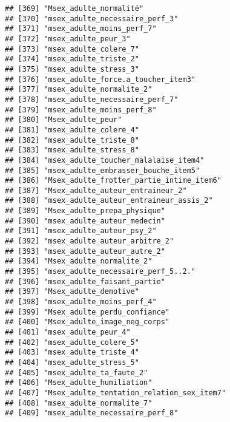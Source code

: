 \documentclass[
]{article}
\begin{document}
\begin{verbatim}
## [369] "Msex_adulte_normalité"                               
## [370] "msex_adulte_necessaire_perf_3"                       
## [371] "msex_adulte_moins_perf_7"                            
## [372] "msex_adulte_peur_3"                                  
## [373] "msex_adulte_colere_7"                                
## [374] "msex_adulte_triste_2"                                
## [375] "msex_adulte_stress_3"                                
## [376] "msex_adulte_force.a_toucher_item3"                   
## [377] "msex_adulte_normalite_2"                             
## [378] "msex_adulte_necessaire_perf_7"                       
## [379] "msex_adulte_moins_perf_8"                            
## [380] "Msex_adulte_peur"                                    
## [381] "msex_adulte_colere_4"                                
## [382] "msex_adulte_triste_8"                                
## [383] "msex_adulte_stress_8"                                
## [384] "msex_adulte_toucher_malalaise_item4"                 
## [385] "msex_adulte_embrasser_bouche_item5"                  
## [386] "Msex_adulte_frotter_partie_intime_item6"             
## [387] "Msex_adulte_auteur_entraineur_2"                     
## [388] "msex_adulte_auteur_entraineur_assis_2"               
## [389] "Msex_adulte_prepa_physique"                          
## [390] "msex_adulte_auteur_medecin"                          
## [391] "msex_adulte_auteur_psy_2"                            
## [392] "msex_adulte_auteur_arbitre_2"                        
## [393] "msex_adulte_auteur_autre_2"                          
## [394] "Msex_adulte_normalite_2"                             
## [395] "msex_adulte_necessaire_perf_5..2."                   
## [396] "msex_adulte_faisant_partie"                          
## [397] "Msex_adulte_demotive"                                
## [398] "msex_adulte_moins_perf_4"                            
## [399] "Msex_adulte_perdu_confiance"                         
## [400] "Msex_adulte_image_neg_corps"                         
## [401] "msex_adulte_peur_4"                                  
## [402] "msex_adulte_colere_5"                                
## [403] "msex_adulte_triste_4"                                
## [404] "msex_adulte_stress_5"                                
## [405] "msex_adulte_ta_faute_2"                              
## [406] "Msex_adulte_humiliation"                             
## [407] "Msex_adulte_tentation_relation_sex_item7"            
## [408] "msex_adulte_normalite_7"                             
## [409] "msex_adulte_necessaire_perf_8"                       

\end{verbatim}
\end{document}
